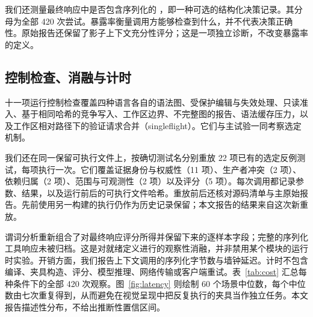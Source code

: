 我们还测量最终响应中是否包含序列化的 ，即一种可选的结构化决策记录。其分母为全部 420 次尝试。暴露率衡量调用方能够检查到什么，并不代表决策正确性。原始报告还保留了影子上下文充分性评分；这是一项独立诊断，不改变暴露率的定义。

\subsection{控制检查、消融与计时}
十一项运行控制检查覆盖四种语言各自的语法图、受保护编辑与失效处理、只读准入、基于相同哈希的竞争写入、工作区边界、不完整图的报告、语法缓存压力，以及工作区相对路径下的验证请求合并（singleflight）。它们与主试验一同考察选定机制。

我们还在同一保留可执行文件上，按确切测试名分别重放 22 项已有的选定反例测试，每项执行一次。它们覆盖证据身份与权威性（11 项）、生产者冲突（2 项）、依赖归属（2 项）、范围与可观测性（2 项）以及评分（5 项）。每次调用都记录参数、结果，以及运行前后的可执行文件哈希。重放前后还核对源码清单与主原始报告。先前使用另一构建的执行仍作为历史记录保留；本文报告的结果来自这次新重放。

谓词分析重新组合了对最终响应评分所得并保留下来的逐样本字段；完整的序列化工具响应未被归档。这是对就绪定义进行的观察性消融，并非禁用某个模块的运行时实验。开销方面，我们报告上下文调用的序列化字节数与墙钟延迟。计时不包含编译、夹具构造、评分、模型推理、网络传输或客户端重试。表~\ref{tab:cost} 汇总每种条件下的全部 420 次观察。图~\ref{fig:latency} 则绘制 60 个场景中位数，每个中位数由七次重复得到，从而避免在视觉呈现中把反复执行的夹具当作独立任务。本文报告描述性分布，不给出推断性置信区间。
